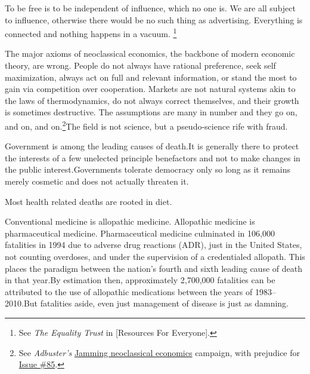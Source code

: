 
To be free is to be independent of influence, which no one is. We are all subject to influence, otherwise there would be no such thing as advertising. Everything is connected and nothing happens in a vacuum. \footnote{See {\it The Equality Trust} in [Resources For Everyone].}


The major axioms of neoclassical economics, the backbone of modern economic theory, are wrong. People do not always have rational preference, seek self maximization, always act on full and relevant information, or stand the most to gain via competition over cooperation. Markets are not natural systems akin to the laws of thermodynamics, do not always correct themselves, and their growth is sometimes destructive. The assumptions are many in number and they go on, and on, and on.\footnote{See {\it Adbuster's} \href{http://anticap.wordpress.com/2010/10/25/jamming-neoclassical-economics/}{Jamming neoclassical economics} campaign, with prejudice for \href{http://www.adbusters.org/cultureshop/backissues/85}{Issue \#85}.}\footnotecite[raj2010]\footnotecite[cobb1999] The field is not science, but a pseudo-science rife with fraud.


Government is among the leading causes of death. It is generally there to protect the interests of a few unelected principle benefactors and not to make changes in the public interest. Governments tolerate democracy only so long as it remains merely cosmetic and does not actually threaten it.


Most health related deaths are rooted in diet.


Conventional medicine is allopathic medicine. Allopathic medicine is pharmaceutical medicine. Pharmaceutical medicine culminated in 106,000 fatalities in 1994 due to adverse drug reactions (ADR), just in the United States, not counting overdoses, and under the supervision of a credentialed allopath. This places the paradigm between the nation's fourth and sixth leading cause of death in that year. By estimation then, approximately 2,700,000 fatalities can be attributed to the use of allopathic medications between the years of 1983--2010. But fatalities aside, even just management of disease is just as damning.


